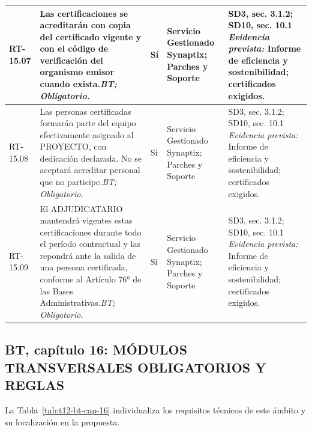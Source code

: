\begin{paginaHorizontalSynaptix}
\begin{longtable}{|L{0.09\AnchoMatrizTDoce}|L{0.385\AnchoMatrizTDoce}|L{0.065\AnchoMatrizTDoce}|L{0.18\AnchoMatrizTDoce}|L{0.28\AnchoMatrizTDoce}|}
RT-\allowbreak{}15.\allowbreak{}07 &
Las certificaciones se acreditarán con copia del certificado vigente y con el código de verificación del organismo emisor cuando exista.\newline\textit{BT; Obligatorio.} &
Sí &
Servicio Gestionado Synaptix; Parches y Soporte &
SD3, sec. 3.1.2; SD10, sec. 10.1 \newline\textit{Evidencia prevista:} Informe de eficiencia y sostenibilidad; certificados exigidos. \\ \hline

RT-\allowbreak{}15.\allowbreak{}08 &
Las personas certificadas formarán parte del equipo efectivamente asignado al PROYECTO, con dedicación declarada. No se aceptará acreditar personal que no participe.\newline\textit{BT; Obligatorio.} &
Sí &
Servicio Gestionado Synaptix; Parches y Soporte &
SD3, sec. 3.1.2; SD10, sec. 10.1 \newline\textit{Evidencia prevista:} Informe de eficiencia y sostenibilidad; certificados exigidos. \\ \hline

RT-\allowbreak{}15.\allowbreak{}09 &
El ADJUDICATARIO mantendrá vigentes estas certificaciones durante todo el período contractual y las repondrá ante la salida de una persona certificada, conforme al Artículo 76° de las Bases Administrativas.\newline\textit{BT; Obligatorio.} &
Sí &
Servicio Gestionado Synaptix; Parches y Soporte &
SD3, sec. 3.1.2; SD10, sec. 10.1 \newline\textit{Evidencia prevista:} Informe de eficiencia y sostenibilidad; certificados exigidos. \\ \hline

\end{longtable}


\subsection*{BT, capítulo 16: MÓDULOS TRANSVERSALES OBLIGATORIOS Y REGLAS}


La Tabla~\ref{tab:t12-bt-cap-16} individualiza los requisitos técnicos de este ámbito y su localización en la propuesta.

\begin{longtable}{|L{0.09\AnchoMatrizTDoce}|L{0.385\AnchoMatrizTDoce}|L{0.065\AnchoMatrizTDoce}|L{0.18\AnchoMatrizTDoce}|L{0.28\AnchoMatrizTDoce}|}


\end{longtable}
\end{paginaHorizontalSynaptix}

